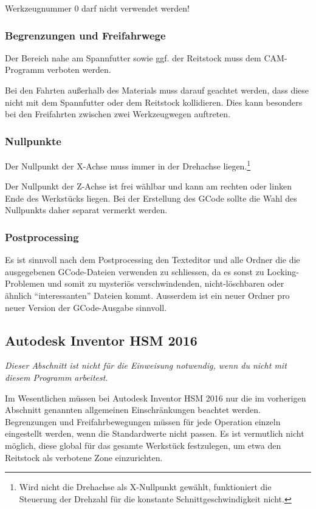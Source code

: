 \documentclass{\basedir/fablab-document}
\begin{document}
Werkzeugnummer 0 darf nicht verwendet werden!

\subsubsection{Begrenzungen und Freifahrwege}

Der Bereich nahe am Spannfutter sowie ggf. der Reitstock muss dem CAM-Programm verboten werden.

Bei den Fahrten außerhalb des Materials muss darauf geachtet werden, dass diese nicht mit dem Spannfutter oder dem Reitstock kollidieren. Dies kann besonders bei den Freifahrten zwischen zwei Werkzeugwegen auftreten.

\subsubsection{Nullpunkte} \label{sec:cnc-erstellung.allg.nullpunkte}
Der Nullpunkt der X-Achse muss immer in der Drehachse liegen.\footnote{Wird nicht die Drehachse als X-Nullpunkt gewählt, funktioniert die Steuerung der Drehzahl für die konstante Schnittgeschwindigkeit nicht.}

Der Nullpunkt der Z-Achse ist frei wählbar und kann am rechten oder linken Ende des Werkstücks liegen. Bei der Erstellung des GCode sollte die Wahl des Nullpunkts daher separat vermerkt werden.

\subsubsection{Postprocessing}
Es ist sinnvoll nach dem Postprocessing den Texteditor und alle Ordner die die ausgegebenen
GCode-Dateien verwenden zu schliessen, da es sonst zu Locking-Problemen und
somit zu mysteriös verschwindenden, nicht-löschbaren oder ähnlich
"`interessanten"' Dateien kommt. Ausserdem ist ein neuer Ordner pro neuer
Version der GCode-Ausgabe sinnvoll.

\subsection{Autodesk Inventor HSM 2016}
\emph{Dieser Abschnitt ist nicht für die Einweisung notwendig, wenn du nicht mit diesem Programm arbeitest.}

Im Wesentlichen müssen bei Autodesk Inventor HSM 2016 nur die im vorherigen Abschnitt genannten allgemeinen Einschränkungen beachtet werden.
Begrenzungen und Freifahrbewegungen müssen für jede Operation einzeln eingestellt werden, wenn die Standardwerte nicht passen. Es ist vermutlich nicht möglich, diese global für das gesamte Werkstück festzulegen, um etwa den Reitstock als verbotene Zone einzurichten.
\end{document}
